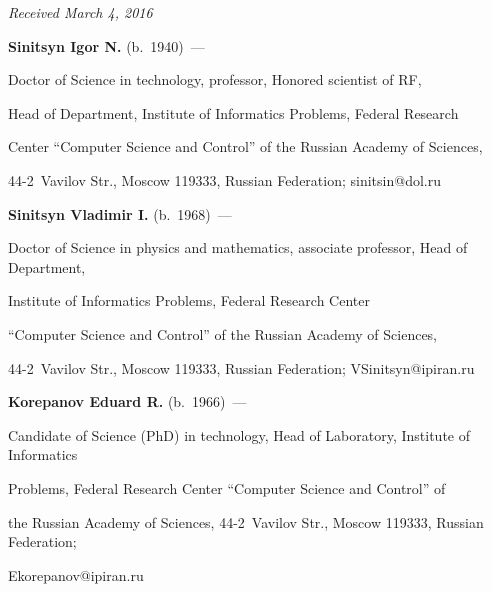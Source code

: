 \hfill{\small\textit{Received March 4, 2016}}



\Contr



\noindent

\textbf{Sinitsyn Igor N.} (b.\ 1940)~--- 

Doctor of Science in technology, professor, Honored scientist of RF, 

Head of Department, Institute of Informatics Problems, Federal Research 

Center ``Computer Science and Control'' of the Russian Academy of Sciences, 

44-2~Vavilov Str., Moscow 119333, Russian Federation; sinitsin@dol.ru 





\vspace*{3pt}



\noindent

\textbf{Sinitsyn Vladimir I.} (b.\ 1968)~---

Doctor of Science in physics and mathematics, associate professor, Head of Department, 

Institute of Informatics Problems, Federal Research Center 

``Computer Science and Control'' of the Russian Academy of Sciences, 

44-2~Vavilov Str., Moscow 119333, Russian Federation; \mbox{VSinitsyn@ipiran.ru} 



\vspace*{3pt}



\noindent

\textbf{Korepanov Eduard R.} (b.\ 1966)~--- 

Candidate of Science (PhD) in technology, Head of Laboratory, Institute of Informatics 

Problems, Federal Research Center ``Computer Science and Control'' of 

the Russian Academy of Sciences, 44-2~Vavilov Str., Moscow 119333, Russian Federation; 

Ekorepanov@ipiran.ru 



\label{end\stat}





\renewcommand{\bibname}{\protect\rm Литература}

